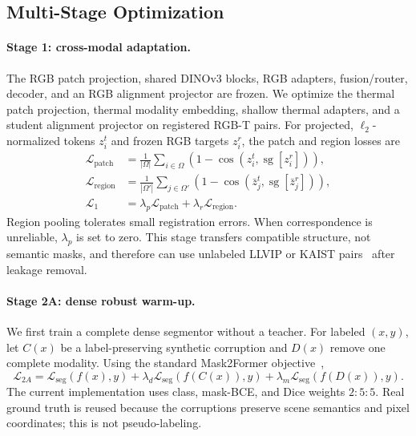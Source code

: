 \documentclass[10pt,twocolumn,letterpaper]{article}
\newcommand{\sg}{\operatorname{sg}}
\begin{document}
\subsection{Multi-Stage Optimization}
\label{sec:training}

\paragraph{Stage 1: cross-modal adaptation.}
The RGB patch projection, shared DINOv3 blocks, RGB adapters, fusion/router, decoder, and an RGB alignment projector are frozen.
We optimize the thermal patch projection, thermal modality embedding, shallow thermal adapters, and a student alignment projector on registered RGB-T pairs.
For projected, $\ell_2$-normalized tokens $z_i^t$ and frozen RGB targets $z_i^r$, the patch and region losses are
\begin{align}
\mathcal L_{\mathrm{patch}}&=\frac{1}{|\Omega|}\sum_{i\in\Omega}
\left(1-\cos(z_i^t,\sg[z_i^r])\right),\\
\mathcal L_{\mathrm{region}}&=\frac{1}{|\Omega'|}\sum_{j\in\Omega'}
\left(1-\cos(\bar z_j^t,\sg[\bar z_j^r])\right),\\
\mathcal L_1&=\lambda_p\mathcal L_{\mathrm{patch}}+
\lambda_r\mathcal L_{\mathrm{region}}.
\end{align}
Region pooling tolerates small registration errors.
When correspondence is unreliable, $\lambda_p$ is set to zero.
This stage transfers compatible structure, not semantic masks, and therefore can use unlabeled LLVIP or KAIST pairs~\cite{jia2021llvip,hwang2015kaist} after leakage removal.

\paragraph{Stage 2A: dense robust warm-up.}
We first train a complete dense segmentor without a teacher.
For labeled $(x,y)$, let $C(x)$ be a label-preserving synthetic corruption and $D(x)$ remove one complete modality.
Using the standard Mask2Former objective~\cite{cheng2022mask2former},
\begin{equation}
\mathcal L_{2A}=\mathcal L_{\mathrm{seg}}(f(x),y)
+\lambda_d\mathcal L_{\mathrm{seg}}(f(C(x)),y)
+\lambda_m\mathcal L_{\mathrm{seg}}(f(D(x)),y).
\label{eq:stage2a}
\end{equation}
The current implementation uses class, mask-BCE, and Dice weights $2{:}5{:}5$.
Real ground truth is reused because the corruptions preserve scene semantics and pixel coordinates; this is not pseudo-labeling.
\end{document}

